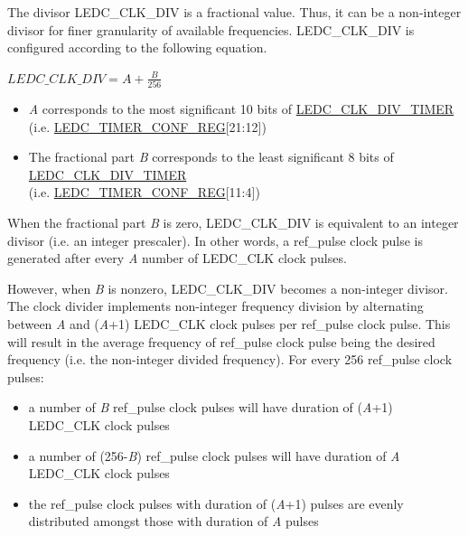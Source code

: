 \documentclass[main\_\_EN.tex]{subfiles}
\begin{document}
The divisor LEDC\_CLK\_DIV is a fractional value. Thus, it can be a non-integer divisor for finer granularity of available frequencies. LEDC\_CLK\_DIV is configured according to the following equation.

\begin{center}
$LEDC\_CLK\_DIV = A + \frac{B}{256}$
\end{center}

\begin{itemize}
    \item \textit{A} corresponds to the most significant 10 bits of \hyperref[fielddesc:LEDCCLKDIVTIMERX]{LEDC\_CLK\_DIV\_TIMER} (i.e. \hyperref[regdesc:LEDCTIMERXCONFREG]{LEDC\_TIMER\_CONF\_REG}[21:12])
    \item The fractional part \textit{B} corresponds to the least significant 8 bits of \hyperref[fielddesc:LEDCCLKDIVTIMERX]{LEDC\_CLK\_DIV\_TIMER} \\(i.e. \hyperref[regdesc:LEDCTIMERXCONFREG]{LEDC\_TIMER\_CONF\_REG}[11:4])
\end{itemize}

When the fractional part \textit{B} is zero, LEDC\_CLK\_DIV is equivalent to an integer divisor (i.e. an integer prescaler). In other words, a ref\_pulse clock pulse is generated after every \textit{A} number of LEDC\_CLK clock pulses.

However, when \textit{B} is nonzero, LEDC\_CLK\_DIV becomes a non-integer divisor. The clock divider implements non-integer frequency division by alternating between \textit{A} and (\textit{A}+1) LEDC\_CLK clock pulses per ref\_pulse clock pulse. This will result in the average frequency of ref\_pulse clock pulse being the desired frequency (i.e. the non-integer divided frequency). For every 256 ref\_pulse clock pulses:

\begin{itemize}
    \item a number of \textit{B} ref\_pulse clock pulses will have duration of (\textit{A}+1) LEDC\_CLK clock pulses
    \item a number of (256-\textit{B}) ref\_pulse clock pulses will have duration of \textit{A} LEDC\_CLK clock pulses
    \item the ref\_pulse clock pulses with duration of (\textit{A}+1) pulses are evenly distributed amongst those with duration of \textit{A} pulses
\end{itemize}
\end{document}
